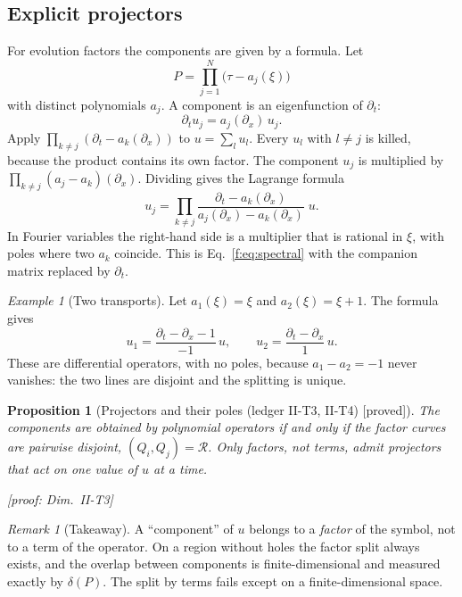 \documentclass[11pt]{article}
\theoremstyle{plain}
\newtheorem{proposition}[theorem]{Proposition}
\theoremstyle{definition}
\theoremstyle{remark}
\newtheorem{remark}[theorem]{Remark}
\newtheorem{example}[theorem]{Example}
\newcommand{\ring}{\mathcal{R}}            %
\newcommand{\badge}[2]{\textcolor{#1}{\textsf{\footnotesize[#2]}}}
\newcommand{\proved}[1][]{\badge{cC}{proved#1}}
\newcommand{\led}[1]{\textcolor{cG}{\textsf{\footnotesize(ledger #1)}}}
\newenvironment{keypoint}{\begin{remark}[Takeaway]}{\end{remark}}
\newcommand{\dimref}[1]{\textsf{\footnotesize[proof: Dim.~#1]}}
\begin{document}
\subsection{Explicit projectors}

For evolution factors the components are given by a formula. Let
\[
P=\prod_{j=1}^N\big(\tau-a_j(\xi)\big)
\]
with distinct polynomials $a_j$. A component is an eigenfunction of $\partial_t$:
\[
\partial_tu_j=a_j(\partial_x)\,u_j .
\]
Apply $\prod_{k\ne j}(\partial_t-a_k(\partial_x))$ to $u=\sum_lu_l$. Every $u_l$ with $l\ne j$ is killed, because the product contains its own factor. The component $u_j$ is multiplied by $\prod_{k\ne j}(a_j-a_k)(\partial_x)$. Dividing gives the Lagrange formula
\begin{equation}\label{f:eq:lagrange}
u_j=\prod_{k\ne j}\frac{\partial_t-a_k(\partial_x)}{a_j(\partial_x)-a_k(\partial_x)}\;u .
\end{equation}
In Fourier variables the right-hand side is a multiplier that is rational in $\xi$, with poles where two $a_k$ coincide. This is Eq.~\eqref{f:eq:spectral} with the companion matrix replaced by $\partial_t$.

\begin{example}[{Two transports}]
Let $a_1(\xi)=\xi$ and $a_2(\xi)=\xi+1$. The formula gives
\[
u_1=\frac{\partial_t-\partial_x-1}{-1}\,u,\qquad u_2=\frac{\partial_t-\partial_x}{1}\,u .
\]
These are differential operators, with no poles, because $a_1-a_2=-1$ never vanishes: the two lines are disjoint and the splitting is unique.
\end{example}

\begin{proposition}[{Projectors and their poles \led{II-T3, II-T4} \proved}]\label{prop:poly-proj}
The components are obtained by \emph{polynomial} operators if and only if the factor curves are pairwise disjoint, $(Q_i,Q_j)=\ring$. Only factors, not terms, admit projectors that act on one value of $u$ at a time.

\dimref{II-T3}
\end{proposition}

\begin{keypoint}
A ``component'' of $u$ belongs to a \emph{factor} of the symbol, not to a term of the operator. On a region without holes the factor split always exists, and the overlap between components is finite-dimensional and measured exactly by $\delta(P)$. The split by terms fails except on a finite-dimensional space.
\end{keypoint}
\end{document}
